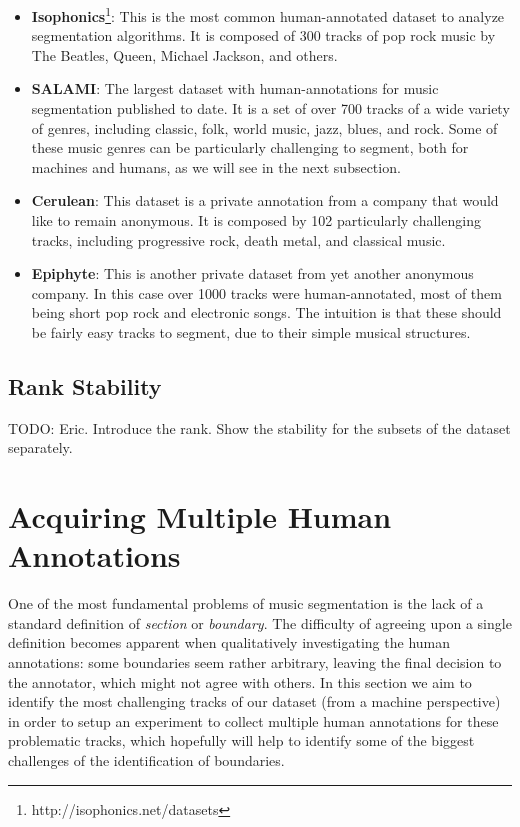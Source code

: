 \documentclass{article}
\begin{document}
\begin{itemize}
  \item
    \textbf{Isophonics}\footnote{http://isophonics.net/datasets}: This is the most common human-annotated dataset to analyze segmentation algorithms. 
    It is composed of 300 tracks of pop rock music by The Beatles, Queen, Michael Jackson, and others.

  \item
    \textbf{SALAMI}\cite{Smith2011}: The largest dataset with human-annotations for music segmentation published to date. 
    It is a set of over 700 tracks of a wide variety of genres, including classic, folk, world music, jazz, blues, and rock.
    Some of these music genres can be particularly challenging to segment, both for machines and humans, as we will see in the next subsection.

  \item
    \textbf{Cerulean}: This dataset is a private annotation from a company that would like to remain anonymous.
    It is composed by 102 particularly challenging tracks, including progressive rock, death metal, and classical music.

  \item
    \textbf{Epiphyte}: This is another private dataset from yet another anonymous company.
    In this case over 1000 tracks were human-annotated, most of them being short pop rock and electronic songs.
    The intuition is that these should be fairly easy tracks to segment, due to their simple musical structures.

\end{itemize}

\subsection{Rank Stability}

TODO: Eric. Introduce the rank. Show the stability for the subsets of the dataset separately.

\section{Acquiring Multiple Human Annotations}

One of the most fundamental problems of music segmentation is the lack of a standard definition of \textit{section} or \textit{boundary}. 
The difficulty of agreeing upon a single definition becomes apparent when qualitatively investigating the human annotations: some boundaries seem rather arbitrary, leaving the final decision to the annotator, which might not agree with others.
In this section we aim to identify the most challenging tracks of our dataset (from a machine perspective) in order to setup an experiment to collect multiple human annotations for these problematic tracks, which hopefully will help to identify some of the biggest challenges of the identification of boundaries.
\end{document}
